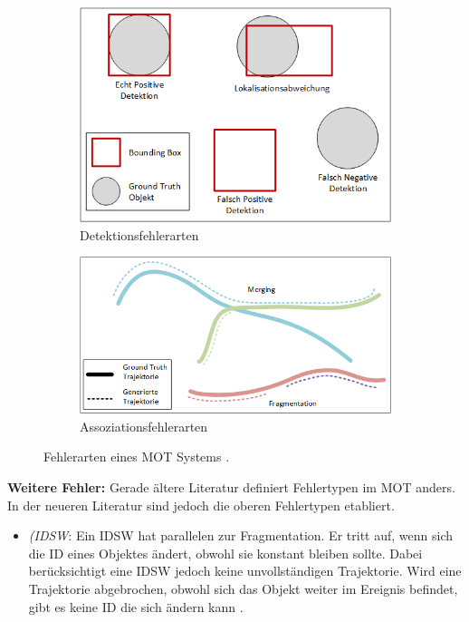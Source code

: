 \begin{figure}[htb]
 \centering
 \begin{subfigure}[htb]{0.7\textwidth}
     \centering
     \includegraphics[width=\textwidth]{img/Grafiken/MOT Fehlerarten Detektionen.png}
     \caption{Detektionsfehlerarten}
 \end{subfigure}
 \hfill
 \begin{subfigure}[htb]{0.7\textwidth}
     \centering
     \includegraphics[width=\textwidth]{img/Grafiken/MOT Fehlerarten Assoziation.png}
     \caption{Assoziationsfehlerarten}
 \end{subfigure}
    \caption{Fehlerarten eines \gls{MOT} Systems \cite{Leichter.2013}.}
    \label{fig:ErrorTypesMOT}
\end{figure}


\textbf{Weitere Fehler:}
Gerade ältere Literatur definiert Fehlertypen im \gls{MOT} anders. In der neueren Literatur sind jedoch die oberen Fehlertypen etabliert.

\begin{itemize}
    \item \textit{(\gls{IDSW}}: Ein \gls{IDSW} hat parallelen zur Fragmentation. Er tritt auf, wenn sich die \gls{ID} eines Objektes ändert, obwohl sie konstant bleiben sollte. Dabei berücksichtigt eine \gls{IDSW} jedoch keine unvollständigen \gls{Trajektorie}. Wird eine \gls{Trajektorie} abgebrochen, obwohl sich das Objekt weiter im \gls{Ereignis} befindet, gibt es keine \acrshort{ID} die sich ändern kann \cite{CLEAR.2008, HOTA, IDF1}.
\end{itemize}

